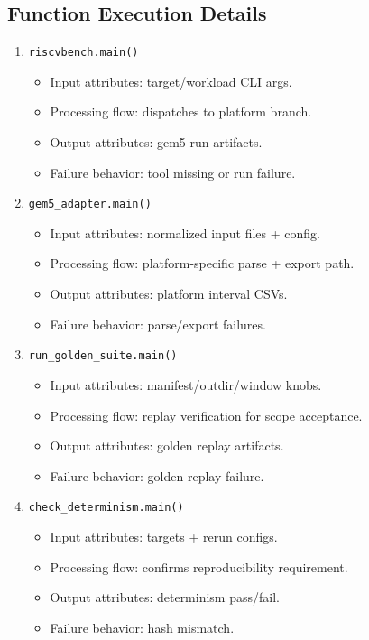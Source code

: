 \documentclass[11pt,a4paper]{article}
\begin{document}
\subsection*{Function Execution Details}
\begin{enumerate}[leftmargin=*]
  \item \texttt{riscvbench.main()}
  \begin{itemize}[leftmargin=*]
    \item Input attributes: target/workload CLI args.
    \item Processing flow: dispatches to platform branch.
    \item Output attributes: gem5 run artifacts.
    \item Failure behavior: tool missing or run failure.
  \end{itemize}
  \item \texttt{gem5\_adapter.main()}
  \begin{itemize}[leftmargin=*]
    \item Input attributes: normalized input files + config.
    \item Processing flow: platform-specific parse + export path.
    \item Output attributes: platform interval CSVs.
    \item Failure behavior: parse/export failures.
  \end{itemize}
  \item \texttt{run\_golden\_suite.main()}
  \begin{itemize}[leftmargin=*]
    \item Input attributes: manifest/outdir/window knobs.
    \item Processing flow: replay verification for scope acceptance.
    \item Output attributes: golden replay artifacts.
    \item Failure behavior: golden replay failure.
  \end{itemize}
  \item \texttt{check\_determinism.main()}
  \begin{itemize}[leftmargin=*]
    \item Input attributes: targets + rerun configs.
    \item Processing flow: confirms reproducibility requirement.
    \item Output attributes: determinism pass/fail.
    \item Failure behavior: hash mismatch.
  \end{itemize}
\end{enumerate}
\end{document}

